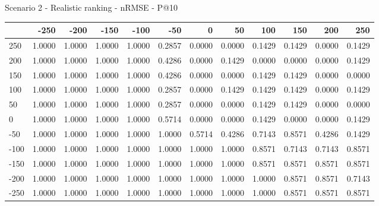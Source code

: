 Scenario 2 - Realistic ranking - nRMSE - P@10
\begin{tabular}{lrrrrrrrrrrr}
\toprule
{} &   -250 &   -200 &   -150 &   -100 &   -50  &    0   &    50  &    100 &    150 &    200 &    250 \\
\midrule
 250 & 1.0000 & 1.0000 & 1.0000 & 1.0000 & 0.2857 & 0.0000 & 0.0000 & 0.1429 & 0.1429 & 0.0000 & 0.1429 \\
 200 & 1.0000 & 1.0000 & 1.0000 & 1.0000 & 0.4286 & 0.0000 & 0.1429 & 0.0000 & 0.0000 & 0.0000 & 0.1429 \\
 150 & 1.0000 & 1.0000 & 1.0000 & 1.0000 & 0.4286 & 0.0000 & 0.0000 & 0.1429 & 0.1429 & 0.0000 & 0.0000 \\
 100 & 1.0000 & 1.0000 & 1.0000 & 1.0000 & 0.2857 & 0.0000 & 0.1429 & 0.1429 & 0.1429 & 0.0000 & 0.1429 \\
 50  & 1.0000 & 1.0000 & 1.0000 & 1.0000 & 0.2857 & 0.0000 & 0.0000 & 0.1429 & 0.1429 & 0.0000 & 0.0000 \\
 0   & 1.0000 & 1.0000 & 1.0000 & 1.0000 & 0.5714 & 0.0000 & 0.0000 & 0.1429 & 0.0000 & 0.0000 & 0.1429 \\
-50  & 1.0000 & 1.0000 & 1.0000 & 1.0000 & 1.0000 & 0.5714 & 0.4286 & 0.7143 & 0.8571 & 0.4286 & 0.1429 \\
-100 & 1.0000 & 1.0000 & 1.0000 & 1.0000 & 1.0000 & 1.0000 & 1.0000 & 0.8571 & 0.7143 & 0.7143 & 0.8571 \\
-150 & 1.0000 & 1.0000 & 1.0000 & 1.0000 & 1.0000 & 1.0000 & 1.0000 & 0.8571 & 0.8571 & 0.8571 & 0.8571 \\
-200 & 1.0000 & 1.0000 & 1.0000 & 1.0000 & 1.0000 & 1.0000 & 1.0000 & 1.0000 & 0.8571 & 0.8571 & 0.7143 \\
-250 & 1.0000 & 1.0000 & 1.0000 & 1.0000 & 1.0000 & 1.0000 & 1.0000 & 1.0000 & 0.8571 & 0.8571 & 0.8571 \\
\bottomrule
\end{tabular}

